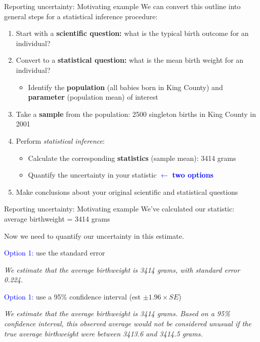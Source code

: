 \documentclass[10pt,t]{beamer}
\begin{document}
\begin{frame}{Reporting uncertainty: Motivating example}
We can convert this outline into general steps for a statistical inference procedure:

\vspace{0.3cm}

\begin{enumerate}
	\item Start with a \textbf{scientific question:} what is the typical birth outcome for an individual?
	\item Convert to a \textbf{statistical question:} what is the mean birth weight for an individual?
	\begin{itemize}
		\item Identify the \textbf{population} (all babies born in King County) and \textbf{parameter} (population mean) of interest
	\end{itemize}
	\item Take a \textbf{sample} from the population: 2500 singleton births in King County in 2001
	\item Perform \textit{statistical inference}:
	\begin{itemize}
		\item Calculate the corresponding \textbf{statistics} (sample mean): 3414 grams
		\item Quantify the uncertainty in your statistic \textcolor{blue}{$\leftarrow$ \textbf{two options}}
	\end{itemize}
	\item Make conclusions about your original scientific and statistical questions
\end{enumerate}
\end{frame}

\begin{frame}{Reporting uncertainty: Motivating example}
We've calculated our statistic: average birthweight = 3414 grams

\vspace{0.3cm}

Now we need to quantify our uncertainty in this estimate.

\vspace{0.3cm}

\textcolor{blue}{Option 1:} use the standard error

\textit{We estimate that the average birthweight is 3414 grams, with standard error 0.224.}

\vspace{0.3cm}

\textcolor{blue}{Option 1:} use a 95\% confidence interval (est $\pm 1.96 \times SE$)

\textit{We estimate that the average birthweight is 3414 grams. Based on a 95\% confidence interval, this observed average would not be considered unusual if the true average birthweight were between 3413.6 and  3414.5 grams.}

\end{frame}
\end{document}

